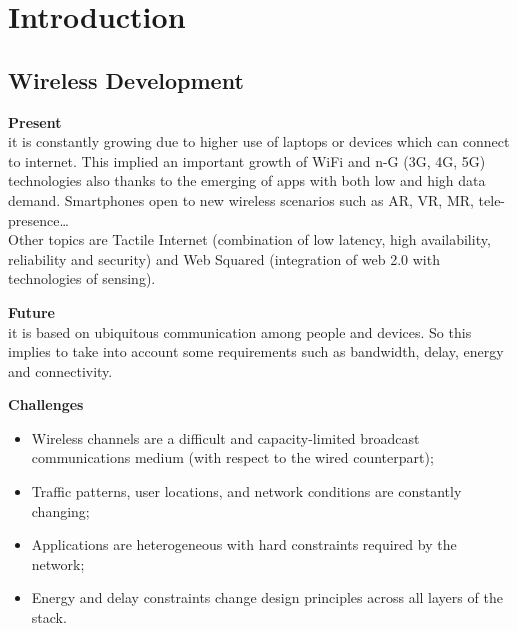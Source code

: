 \section{Introduction}
\subsection{Wireless Development}

\textbf{Present}\\ it is constantly growing
due to higher use of laptops or devices which can
connect to internet. This implied an
important growth of WiFi and n-G (3G, 4G, 5G)
technologies also thanks to the emerging of
apps with both low and high data demand.
Smartphones open to new wireless scenarios such as
AR, VR, MR, tele-presence\dots\\Other topics are
Tactile Internet (combination of low latency, high
availability, reliability and security) and Web
Squared (integration of web 2.0 with technologies of
sensing).

\textbf{Future}\\ it is based on ubiquitous
communication among people and devices. So this implies
to take into account some requirements such as 
bandwidth, delay, energy and connectivity.

\textbf{Challenges}
\begin{itemize}
    \item Wireless channels are a difficult and
    capacity-limited broadcast communications medium
    (with respect to the wired counterpart);
    \item Traffic patterns, user locations, and network
    conditions are constantly changing;
    \item Applications are heterogeneous with hard
    constraints required by the network;
    \item Energy and delay constraints change design
    principles across all layers of the stack.
\end{itemize}

